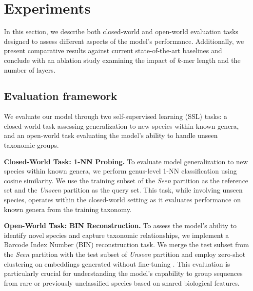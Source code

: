 \section{Experiments}

In this section, we describe both closed-world and open-world evaluation tasks designed to assess different aspects of the model's performance. Additionally, we present comparative results against current state-of-the-art baselines and conclude with an ablation study examining the impact of $k$-mer length and the number of layers.



\subsection{Evaluation framework}
We evaluate our model through two self-supervised learning (SSL) tasks: a closed-world task assessing generalization to new species within known genera, and an open-world task evaluating the model's ability to handle unseen taxonomic groups.

\textbf{Closed-World Task: 1-NN Probing.} To evaluate model generalization to new species within known genera, we perform genus-level 1-NN classification using cosine similarity. We use the training subset of the \textit{Seen} partition as the reference set and the \textit{Unseen} partition as the query set. This task, while involving unseen species, operates within the closed-world setting as it evaluates performance on known genera from the training taxonomy.

\textbf{Open-World Task: BIN Reconstruction.} To assess the model's ability to identify novel species and capture taxonomic relationships, we implement a Barcode Index Number (BIN) reconstruction task. We merge the test subset from the \textit{Seen} partition with the test subset of \textit{Unseen} partition and employ zero-shot clustering on embeddings generated without fine-tuning \citep{zsc-Lowe-2024}. This evaluation is particularly crucial for understanding the model's capability to group sequences from rare or previously unclassified species based on shared biological features.


